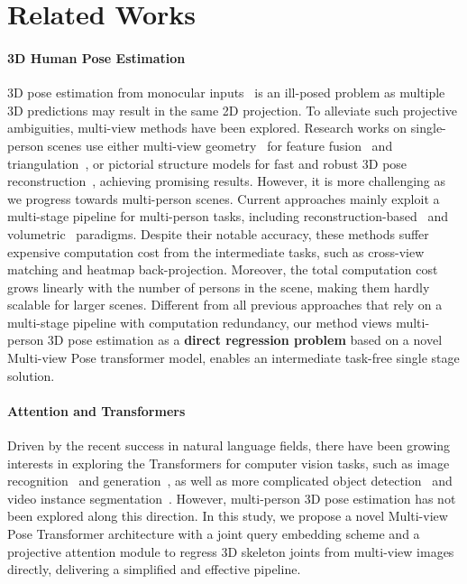 \documentclass{article}
\begin{document}
\section{Related Works}

\paragraph{3D Human Pose Estimation}
3D pose estimation from monocular inputs~\cite{martinez2017simple,mehta2017vnect,zhou2017towards,popa2017deep,sun2018integral,nie2019spm,zhang2020inference,gong2021poseaug,zhang2021bmp} is an ill-posed problem as multiple 3D predictions may result in the same 2D projection. 
To alleviate such projective ambiguities, multi-view methods have been explored.
Research works on single-person scenes use either multi-view geometry~\cite{Hartley2003MVG} for feature fusion~\cite{qiu2019cross,he2020epipolar} and triangulation~\cite{iskakov2019learnable,remelli2020lightweight}, or pictorial structure models for fast and robust 3D pose reconstruction~\cite{pavlakos2017harvesting,qiu2019cross}, achieving promising results. 
However, it is more challenging as we progress towards multi-person scenes.
Current approaches mainly exploit a multi-stage pipeline for multi-person tasks, including reconstruction-based~\cite{dong2019fast,chen2020multi,huang2020end,kadkhodamohammadi2021generalizable,lin2021multi} and volumetric~\cite{Tu2020} paradigms. 
Despite their notable accuracy, these methods suffer expensive computation cost from the intermediate tasks, such as cross-view matching and heatmap back-projection.
Moreover, the total computation cost grows linearly with the number of persons in the scene, making them hardly scalable for larger scenes.
Different from all previous approaches that rely on a multi-stage pipeline with computation redundancy, our method views multi-person 3D pose estimation as a \textbf{direct regression problem} based on a novel Multi-view Pose transformer model, enables an intermediate task-free single stage solution.

\paragraph{Attention and Transformers}
Driven by the recent success in natural language fields, there have been growing interests in exploring the Transformers for computer vision tasks, such as image recognition~\cite{dosovitskiy2020} and generation~\cite{jiang2021transgan}, as well as more complicated object detection~\cite{carion2020end,zhu2020deformabledetr} and video instance segmentation~\cite{wang2020end}.
However, multi-person 3D pose estimation has not been explored along this direction. 
In this study, we propose a novel Multi-view Pose Transformer architecture with a joint query embedding scheme and a projective attention module to regress 3D skeleton joints from multi-view images directly, delivering a simplified and effective pipeline. 
\end{document}
